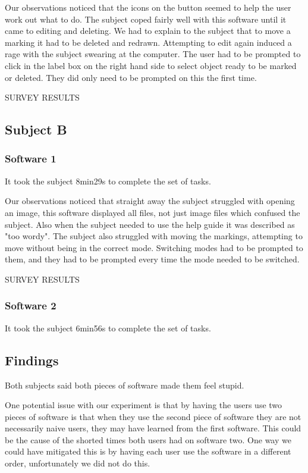 \documentclass[a4paper,11pt,oneside]{article}
\begin{document}
Our observations noticed that the icons on the button seemed to help the user work out what to do.  The subject coped fairly well with this software until it came to editing and deleting.  We had to explain to the subject that to move a marking it had to be deleted and redrawn.  Attempting to edit again induced a rage with the subject swearing at the computer.  The user had to be prompted to click in the label box on the right hand side to select object ready to be marked or deleted.  They did only need to be prompted on this the first time.

SURVEY RESULTS

\subsection{Subject B}
\subsubsection{Software 1}
It took the subject 8min29s to complete the set of tasks.

Our observations noticed that straight away the subject struggled with opening an image, this software displayed all files, not just image files which confused the subject.  Also when the subject needed to use the help guide it was described as "too wordy".  The subject also struggled with moving the markings, attempting to move without being in the correct mode.  Switching modes had to be prompted to them, and they had to be prompted every time the mode needed to be switched.

SURVEY RESULTS



\subsubsection{Software 2}
It took the subject 6min56s to complete the set of tasks.

\subsection{Findings}
Both subjects said both pieces of software made them feel stupid.

One potential issue with our experiment is that by having the users use two pieces of software is that when they use the second piece of software they are not necessarily naive users, they may have learned from the first software.  This could be the cause of the shorted times both users had on software two.  One way we could have mitigated this is by having each user use the software in a different order, unfortunately we did not do this.
\end{document}

